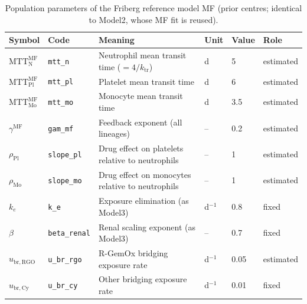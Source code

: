 \begin{table}[!htbp]
\centering
\footnotesize
\setlength{\tabcolsep}{3.5pt}
\caption{Population parameters of the Friberg reference model MF (prior centres; identical to Model2, whose MF fit is reused).}
\label{tab:mf}
\begin{tabular}{ll>{\raggedright\arraybackslash}p{6cm}lll}
\toprule
Symbol & Code & Meaning & Unit & Value & Role \\
\midrule
$\mathrm{MTT}^{\mathrm{MF}}_{\mathrm{N}}$ & \texttt{mtt\_n} & Neutrophil mean transit time ($=4/k_{\mathrm{tr}}$) & d & 5 & estimated \\
$\mathrm{MTT}^{\mathrm{MF}}_{\mathrm{Pl}}$ & \texttt{mtt\_pl} & Platelet mean transit time & d & 6 & estimated \\
$\mathrm{MTT}^{\mathrm{MF}}_{\mathrm{Mo}}$ & \texttt{mtt\_mo} & Monocyte mean transit time & d & 3.5 & estimated \\
$\gamma^{\mathrm{MF}}$ & \texttt{gam\_mf} & Feedback exponent (all lineages) & -- & 0.2 & estimated \\
$\rho_{\mathrm{Pl}}$ & \texttt{slope\_pl} & Drug effect on platelets relative to neutrophils & -- & 1 & estimated \\
$\rho_{\mathrm{Mo}}$ & \texttt{slope\_mo} & Drug effect on monocytes relative to neutrophils & -- & 1 & estimated \\
$k_e$ & \texttt{k\_e} & Exposure elimination (as Model3) & d$^{-1}$ & 0.8 & fixed \\
$\beta$ & \texttt{beta\_renal} & Renal scaling exponent (as Model3) & -- & 0.7 & fixed \\
$u_{\mathrm{br,RGO}}$ & \texttt{u\_br\_rgo} & R-GemOx bridging exposure rate & d$^{-1}$ & 0.05 & estimated \\
$u_{\mathrm{br,Cy}}$ & \texttt{u\_br\_cy} & Other bridging exposure rate & d$^{-1}$ & 0.01 & fixed \\
\bottomrule
\end{tabular}
\end{table}
